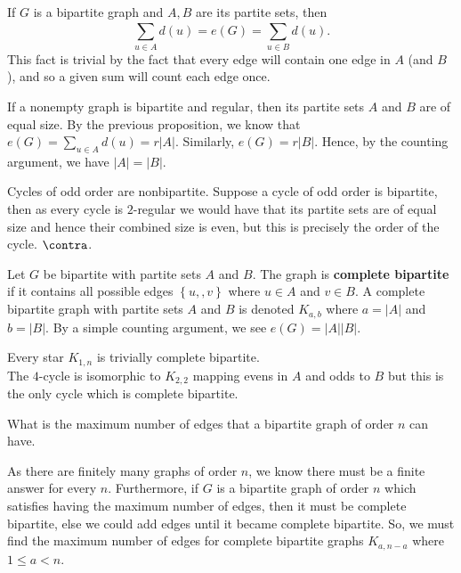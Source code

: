 \begin{proposition}
	If $G$ is a bipartite graph and $A,B$ are its partite sets, then \[
		\sum_{u \in A}^{} d\left( u \right)  = e\left( G \right) = \sum_{u \in B}^{} d \left( u \right)
	.\]
	This fact is trivial by the fact that every edge will contain one edge in $A$ (and $B$ ), and so a given sum will count each edge once.
\end{proposition}
\begin{proposition}
	If a nonempty graph is bipartite and regular, then its partite sets $A$ and $B$ are of equal size. By the previous proposition, we know that $e \left( G \right) = \sum_{ u \in A}^{} d\left( u \right) = r \left| A \right| $. Similarly, $e \left( G \right) = r \left| B \right| $. Hence, by the counting argument, we have $\left| A \right|  = \left| B \right| $.
\end{proposition}
\begin{corollary}
	Cycles of odd order are nonbipartite. Suppose a cycle of odd order is bipartite, then as every cycle is $2$-regular we would have that its partite sets are of equal size and hence their combined size is even, but this is precisely the order of the cycle.  $\contra$.
\end{corollary}
\begin{definition}
	Let $G$ be bipartite with partite sets $A$ and $B$. The graph is \textbf{complete bipartite} if it contains all possible edges $\left\{ u,,v \right\} $ where $u \in A$ and $v \in B$. A complete bipartite graph with partite sets $A$ and $B$ is denoted $K_{a,b}$ where $a = \left| A \right| $ and $b = \left| B \right| $. By a simple counting argument, we see $e\left( G \right) = \left| A \right| \left| B \right| $.
\end{definition}
\begin{example}
	Every star $K_{1,n}$ is trivially complete bipartite.\\
	The $4$-cycle is isomorphic to $K_{2,2}$ mapping evens in $A$ and odds to $B$ but this is the only cycle which is complete bipartite.
\end{example}
\begin{problem}
	What is the maximum number of edges that a bipartite graph of order $n$ can have.
\end{problem}
As there are finitely many graphs of order $n$, we know there must be a finite answer for every $n$. Furthermore, if $G$ is a bipartite graph of order  $n$ which satisfies having the maximum number of edges, then it must be complete bipartite, else we could add edges until it became complete bipartite. So, we must find the maximum number of edges for complete bipartite graphs $K_{a,n-a}$ where $1\le a < n$.

